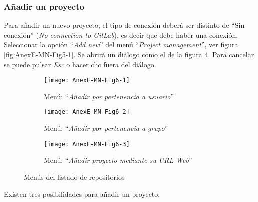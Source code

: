 \subsubsection{Añadir un proyecto}
Para añadir un nuevo proyecto, el tipo de conexión deberá ser distinto de ``Sin conexión'' (\textit{No connection to GitLab}), es decir que debe haber una conexión. Seleccionar la opción ``\textit{Add new}'' del menú ``\textit{Project management}'', ver figura \ref{fig:AnexE-MN-Fig5-1}. Se abrirá un diálogo como el de la figura \ref{fig:AnexE-MN-Fig6}. Para \underline{cancelar} se puede pulsar \textit{Esc} o hacer clic fuera del diálogo.
\begin{figure}[!h]
	\centering
	\begin{subfigure}{.45\textwidth}
		\centering
		\texttt{[image: AnexE-MN-Fig6-1]}
		\caption{Menú: ``\textit{Añadir por pertenencia a usuario}''}
		\label{fig:AnexE-MN-Fig6-1}
	\end{subfigure}\hfill
	\begin{subfigure}{.45\textwidth}
		\centering
		\texttt{[image: AnexE-MN-Fig6-2]}
		\caption{Menú: ``\textit{Añadir por pertenencia a grupo}''}
		\label{fig:AnexE-MN-Fig6-2}
	\end{subfigure}
	\begin{subfigure}{.45\textwidth}
		\centering
		\texttt{[image: AnexE-MN-Fig6-3]}
		\caption{Menú: ``\textit{Añadir proyecto mediante su URL Web}''}
		\label{fig:AnexE-MN-Fig6-3}
	\end{subfigure}
	\caption{Menús del listado de repositorios}
	\label{fig:AnexE-MN-Fig6}
\end{figure}
Existen tres posibilidades para añadir un proyecto:
